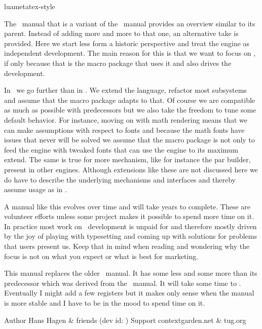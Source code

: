 
\environment luametatex-style

\startdocument[title=Introduction]

The \LUAMETATEX\ manual that is a variant of the \LUATEX\ manual provides an
overview similar to its parent. Instead of adding more and more to that one, an
alternative take is provided. Here we start less form a historic perspective and
treat the engine as independent development. The main reason for this is that we
want to focus on \CONTEXT, if only because that is the macro package that uses it
and also drives the development.

In \LUAMETATEX\ we go further than in \LUATEX. We extend the language, refactor
most subsystems and assume that the macro package adapts to that. Of course we
are compatible as much as possible with predecessors but we also take the freedom
to tune some default behavior. For instance, moving on with math rendering means
that we can make assumptions with respect to fonts and because the math fonts
have issues that never will be solved we assume that the macro package is not
only to feed the engine with tweaked fonts that can use the engine to its maximum
extend. The same is true for more mechanism, like for instance the par builder,
present in other engines. Although extensions like these are not discussed here we
do have to describe the underlying mechanisms and interfaces and thereby assume
usage as in \CONTEXT.

A manual like this evolves over time and will take years to complete. These are
volunteer efforts unless some project makes it possible to spend more time on it.
In practice most work on \TEX\ development is unpaid for and therefore mostly
driven by the joy of playing with typesetting and coming up with solutions for
problems that users present us. Keep that in mind when reading and wondering why
the focus is not on what you expect or what is best for marketing.

This manual replaces the older \LUAMETATEX\ manual. It has some less and some
more than its predecessor which was derived from the \LUATEX\ manual. It will
take some time to . Eventually I might add a few registers but
it makes only sense when the manual is more stable and I have to be in the mood
to spend time on it.

\starttabulate[|||]
    \NC Author      \NC Hans Hagen & friends        \NC \NR
    \NC \CONTEXT    \NC \contextversion             \NC \NR
    \NC \LUAMETATEX \NC \luametatexverboseversion   %
                        \space (dev id: \luametatexfunctionality)  \NC \NR
    \NC Support     \NC contextgarden.net & tug.org \NC \NR
\stoptabulate

\stopdocument
